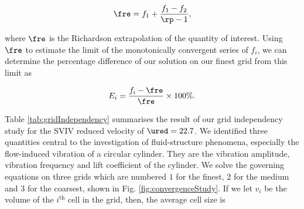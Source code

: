 \documentclass[a4paper,fleqn]{cas-sc}
\begin{document}
\begin{equation}
  \fre = f_{1} + \frac{f_{1} - f_{2}}{\rp - 1},
  \label{eq:richardsonExtrapolation}
\end{equation}

\noindent where $\fre$ is the Richardson extrapolation of the quantity of interest. Using $\fre$ to estimate the limit of the monotonically convergent series of $f_{i}$, we can determine the percentage difference of our solution on our finest grid from this limit as

\begin{equation}
  E_{i} = \frac{f_{i} - \fre}{\fre} \times 100\%.
  \label{eq:percentageDifference}
\end{equation}

Table \ref{tab:gridIndependency} summarises the result of our grid independency study for the SVIV reduced velocity of $\ured = 22.7$. We identified three quantities central to the investigation of fluid-structure phenomena, especially the flow-induced vibration of a circular cylinder. They are the vibration amplitude, vibration frequency and lift coefficient of the cylinder. We solve the governing equations on three grids which are numbered $1$ for the finest, $2$ for the medium and $3$ for the coarsest, shown in Fig. \ref{fig:convergenceStudy}. If we let $v_{i}$ be the volume of the $i^{\text{th}}$ cell in the grid, then, the average cell size is
\end{document}
